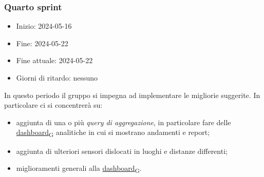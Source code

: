 \newpage
\subsubsection{Quarto sprint}
\begin{itemize}
	\item Inizio: 2024-05-16
	\item Fine: 2024-05-22
	\item Fine attuale: 2024-05-22
	\item Giorni di ritardo: nessuno
\end{itemize}

In questo periodo il gruppo si impegna ad implementare le migliorie suggerite.
In particolare ci si concentrerà su:
\begin{itemize}
	\item aggiunta di una o più \textit{query di aggregazione}, in particolare fare delle \href{https://7last.github.io/docs/pb/documentazione-interna/glossario\#dashboard}{dashboard\textsubscript{G}} analitiche in cui si
	      mostrano andamenti e report;
	\item aggiunta di ulteriori sensori dislocati in luoghi e distanze differenti;
	\item miglioramenti generali alla \href{https://7last.github.io/docs/pb/documentazione-interna/glossario\#dashboard}{dashboard\textsubscript{G}}.
\end{itemize}

